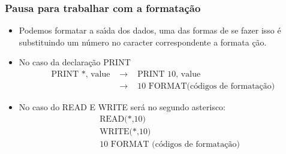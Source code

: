 \documentclass[notes=show]{beamer}
\begin{document}
\begin{frame}%

\frametitle{Pausa para trabalhar com a formata\c{c}\~{a}o}

\begin{itemize}
\item Podemos formatar a sa\'{\i}da dos dados, uma das formas de se fazer
isso \'{e} substituindo um n\'{u}mero no caracter correspondente a formata%
\c{c}\~{a}o.

\item No caso da declara\c{c}\~{a}o PRINT%
\begin{eqnarray*}
\text{PRINT *, value \ \ } &\rightarrow &\text{ \ \ \ \ PRINT 10, value} \\
&\rightarrow &\text{ \ \ \ \ 10 FORMAT(códigos de formata\c{c}\~{a}o)}
\end{eqnarray*}

\item No caso do READ E WRITE ser\'{a} no segundo asterisco:%
\begin{eqnarray*}
&&\text{READ(*,10)} \\
&&\text{WRITE(*,10)} \\
&&\text{10 FORMAT (códigos de formata\c{c}\~{a}o)}
\end{eqnarray*}
\end{itemize}

\transboxout%
\end{frame}%
\end{document}
